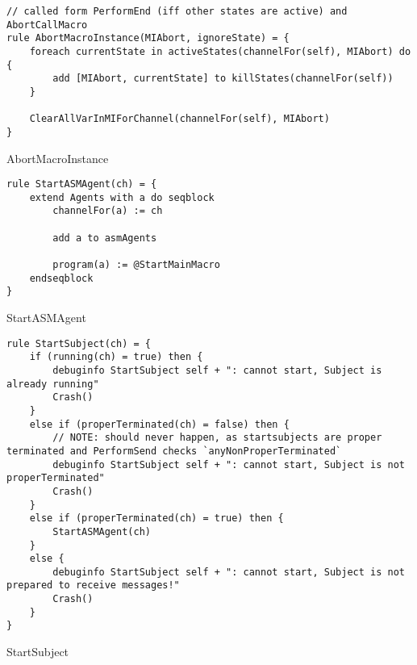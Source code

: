 \begin{listing}[H]
\begin{verbatim}
// called form PerformEnd (iff other states are active) and AbortCallMacro
rule AbortMacroInstance(MIAbort, ignoreState) = {
    foreach currentState in activeStates(channelFor(self), MIAbort) do {
        add [MIAbort, currentState] to killStates(channelFor(self))
    }

    ClearAllVarInMIForChannel(channelFor(self), MIAbort)
}
\end{verbatim}
\caption{AbortMacroInstance}
\label{lst:asm:AbortMacroInstance}
\end{listing}




\begin{listing}[H]
\begin{verbatim}
rule StartASMAgent(ch) = {
    extend Agents with a do seqblock
        channelFor(a) := ch

        add a to asmAgents

        program(a) := @StartMainMacro
    endseqblock
}
\end{verbatim}
\caption{StartASMAgent}
\label{lst:asm:StartASMAgent}
\end{listing}




\begin{listing}[H]
\begin{verbatim}
rule StartSubject(ch) = {
    if (running(ch) = true) then {
        debuginfo StartSubject self + ": cannot start, Subject is already running"
        Crash()
    }
    else if (properTerminated(ch) = false) then {
        // NOTE: should never happen, as startsubjects are proper terminated and PerformSend checks `anyNonProperTerminated`
        debuginfo StartSubject self + ": cannot start, Subject is not properTerminated"
        Crash()
    }
    else if (properTerminated(ch) = true) then {
        StartASMAgent(ch)
    }
    else {
        debuginfo StartSubject self + ": cannot start, Subject is not prepared to receive messages!"
        Crash()
    }
}
\end{verbatim}
\caption{StartSubject}
\label{lst:asm:StartSubject}
\end{listing}




